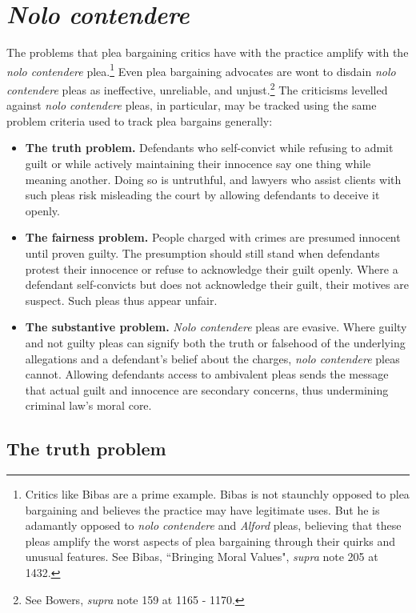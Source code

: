 \section{\textit{Nolo contendere}}

The problems that plea bargaining critics have with the practice amplify with the \textit{nolo contendere} plea.\footnote{Critics like Bibas are a prime example. Bibas is not staunchly opposed to plea bargaining and believes the practice may have legitimate uses. But he is adamantly opposed to \textit{nolo contendere} and \textit{Alford} pleas, believing that these pleas amplify the worst aspects of plea bargaining through their quirks and unusual features. See Bibas, ``Bringing Moral Values", \textit{supra} note 205 at 1432.} Even plea bargaining advocates are wont to disdain \textit{nolo contendere} pleas as ineffective, unreliable, and unjust.\footnote{See Bowers, \textit{supra} note 159 at 1165 - 1170.} The criticisms levelled against \textit{nolo contendere} pleas, in particular, may be tracked using the same problem criteria used to track plea bargains generally:

\begin{itemize}
    \item \textbf{The truth problem.} Defendants who self-convict while refusing to admit guilt or while actively maintaining their innocence say one thing while meaning another. Doing so is untruthful, and lawyers who assist clients with such pleas risk misleading the court by allowing defendants to deceive it openly. 
    \item \textbf{The fairness problem.} People charged with crimes are presumed innocent until proven guilty. The presumption should still stand when defendants protest their innocence or refuse to acknowledge their guilt openly. Where a defendant self-convicts but does not acknowledge their guilt, their motives are suspect. Such pleas thus appear unfair. 
    \item \textbf{The substantive problem.} \textit{Nolo contendere} pleas are evasive. Where guilty and not guilty pleas can signify both the truth or falsehood of the underlying allegations and a defendant's belief about the charges, \textit{nolo contendere} pleas cannot. Allowing defendants access to ambivalent pleas sends the message that actual guilt and innocence are secondary concerns, thus undermining criminal law's moral core. 
    
\end{itemize}

\subsection{The truth problem}

